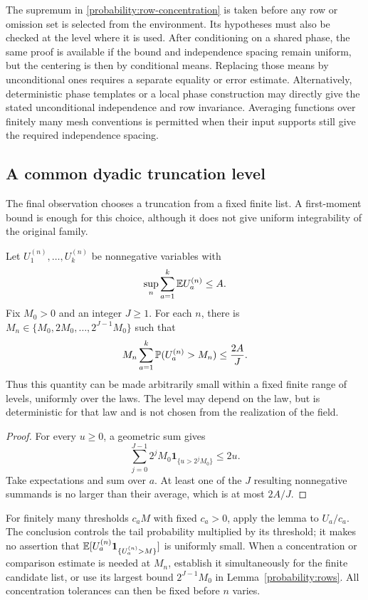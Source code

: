 The supremum in \eqref{probability:row-concentration} is taken
before any row or omission set is selected from the environment.
Its hypotheses must also be checked at the level where it is used.
After conditioning on a shared phase, the same proof is available
if the bound and independence spacing remain uniform, but the
centering is then by conditional means.  Replacing those means by
unconditional ones requires a separate equality or error estimate.
Alternatively, deterministic phase templates or a local phase
construction may directly give the stated unconditional
independence and row invariance.  Averaging functions over finitely
many mesh conventions is permitted when their input supports still
give the required independence spacing.

\subsection{A common dyadic truncation level}

The final observation chooses a truncation from a fixed finite
list.  A first-moment bound is enough for this choice, although it
does not give uniform integrability of the original family.

\begin{lemma}
\label{probability:dyadic}
Let $U_1^{(n)},\ldots,U_k^{(n)}$ be nonnegative variables with
\[
                 \sup_n\sum_{a=1}^k\mathbb E U_a^{(n)}\le A.
\]
Fix $M_0>0$ and an integer $J\ge1$.  For each $n$, there is
$M_n\in\{M_0,2M_0,\ldots,2^{J-1}M_0\}$ such that
\begin{equation}
        M_n\sum_{a=1}^k\mathbb P(U_a^{(n)}>M_n)
                                      \le\frac{2A}{J}.
 \label{probability:good-level}
\end{equation}
Thus this quantity can be made arbitrarily small within a fixed
finite range of levels, uniformly over the laws.  The level may
depend on the law, but is deterministic for that law and is not
chosen from the realization of the field.
\end{lemma}

\begin{proof}
For every $u\ge0$, a geometric sum gives
\[
 \sum_{j=0}^{J-1}2^jM_0\mathbf1_{\{u>2^jM_0\}}\le2u.
\]
Take expectations and sum over $a$.  At least one of the $J$
resulting nonnegative summands is no larger than their average,
which is at most $2A/J$.
\end{proof}

For finitely many thresholds $c_aM$ with fixed $c_a>0$, apply
the lemma to $U_a/c_a$.  The conclusion controls the tail
probability multiplied by its threshold; it makes no assertion
that $\mathbb E[U_a^{(n)}\mathbf1_{\{U_a^{(n)}>M\}}]$ is uniformly
small.  When a concentration or comparison estimate is needed at
$M_n$, establish it simultaneously for the finite candidate list,
or use its largest bound $2^{J-1}M_0$ in
Lemma~\ref{probability:rows}.  All concentration tolerances can
then be fixed before $n$ varies.
